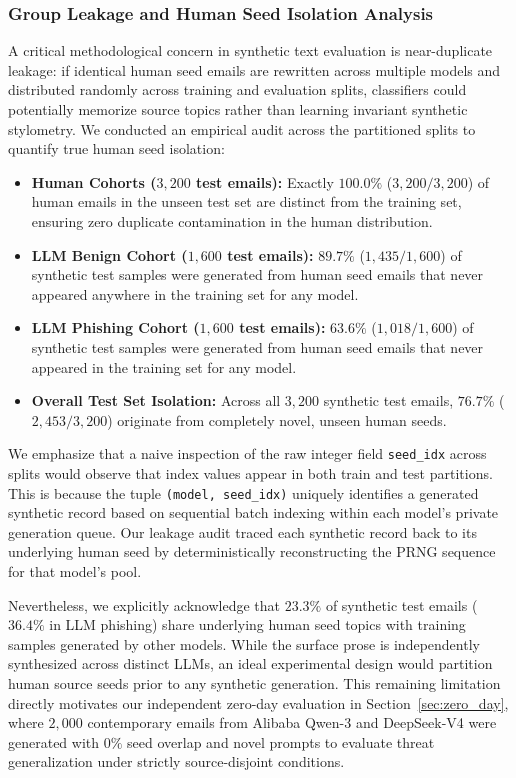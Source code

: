 \documentclass[journal]{IEEEtran}
\begin{document}
\subsubsection{Group Leakage and Human Seed Isolation Analysis}
A critical methodological concern in synthetic text evaluation is near-duplicate leakage: if identical human seed emails are rewritten across multiple models and distributed randomly across training and evaluation splits, classifiers could potentially memorize source topics rather than learning invariant synthetic stylometry. We conducted an empirical audit across the partitioned splits to quantify true human seed isolation:
\begin{itemize}
    \item \textbf{Human Cohorts ($3{,}200$ test emails):} Exactly $100.0\%$ ($3{,}200 / 3{,}200$) of human emails in the unseen test set are distinct from the training set, ensuring zero duplicate contamination in the human distribution.
    \item \textbf{LLM Benign Cohort ($1{,}600$ test emails):} $89.7\%$ ($1{,}435 / 1{,}600$) of synthetic test samples were generated from human seed emails that never appeared anywhere in the training set for any model.
    \item \textbf{LLM Phishing Cohort ($1{,}600$ test emails):} $63.6\%$ ($1{,}018 / 1{,}600$) of synthetic test samples were generated from human seed emails that never appeared in the training set for any model.
    \item \textbf{Overall Test Set Isolation:} Across all $3{,}200$ synthetic test emails, $76.7\%$ ($2{,}453 / 3{,}200$) originate from completely novel, unseen human seeds.
\end{itemize}
We emphasize that a naive inspection of the raw integer field \texttt{seed\_idx} across splits would observe that index values appear in both train and test partitions. This is because the tuple \texttt{(model, seed\_idx)} uniquely identifies a generated synthetic record based on sequential batch indexing within each model's private generation queue. Our leakage audit traced each synthetic record back to its underlying human seed by deterministically reconstructing the PRNG sequence for that model's pool.

Nevertheless, we explicitly acknowledge that $23.3\%$ of synthetic test emails ($36.4\%$ in LLM phishing) share underlying human seed topics with training samples generated by other models. While the surface prose is independently synthesized across distinct LLMs, an ideal experimental design would partition human source seeds prior to any synthetic generation. This remaining limitation directly motivates our independent zero-day evaluation in Section~\ref{sec:zero_day}, where $2{,}000$ contemporary emails from Alibaba Qwen-3 and DeepSeek-V4 were generated with $0\%$ seed overlap and novel prompts to evaluate threat generalization under strictly source-disjoint conditions.
\end{document}
